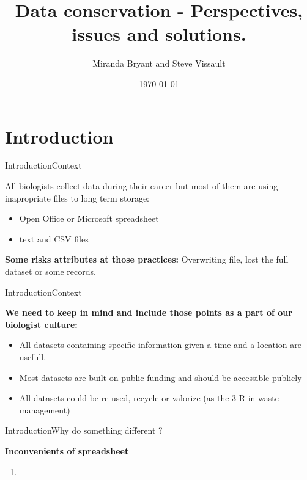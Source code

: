 \documentclass{eecslides}
\title[Data Storage]{Data conservation - Perspectives, issues and solutions.}
\author[M. Bryant and S. Vissault]{\color{white}  Miranda Bryant and Steve Vissault}
\institute[\color{white} UQAR]{\color{white} \textbf{Les midis numériques}}
\date{ \color{white} \today}
\begin{document}
\begin{frame}[plain]
\titlepage
\end{frame}


\section{Introduction}

\begin{frame}{Introduction}{Context}

All biologists collect data during their career but most of them are using \alert{inapropriate files} to long term storage:

\begin{itemize}
	\item  Open Office or Microsoft spreadsheet
	\item  text and CSV files
\end{itemize}

\textbf{Some risks attributes at those practices:} Overwriting file, lost the full dataset or some records.

\end{frame}


\begin{frame}{Introduction}{Context}

\textbf{We need to keep in mind and include those points as a part of our biologist culture:}
	
	\begin{itemize}
		\item \alert{All datasets} containing specific information given a time and a location \alert{are usefull}.
		\item Most datasets are built on \alert{public funding} and should be accessible publicly
		\item All datasets could be re-used, recycle or valorize (as the 3-R in waste management) 
	\end{itemize}


\end{frame}


\begin{frame}{Introduction}{Why do something different ?}

\textbf{\alert{Inconvenients of spreadsheet}}

\begin{enumerate}
	\item 
\end{enumerate}

\end{frame}
\end{document}

